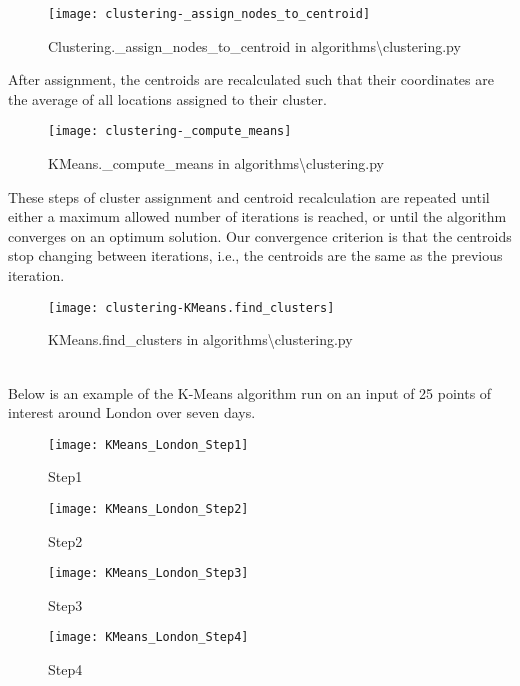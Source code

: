 \begin{figure}[H]\label{fig:_assign_nodes_to_centroid}
    \centering
    \texttt{[image: clustering-\_assign\_nodes\_to\_centroid]}
    \caption{Clustering.\_assign\_nodes\_to\_centroid in algorithms\textbackslash clustering.py}
\end{figure}
\noindent
After assignment, the centroids are recalculated such that their coordinates are the average of all locations
assigned to their cluster.

\begin{figure}[H]\label{fig:_compute_means}
    \centering
    \texttt{[image: clustering-\_compute\_means]}
    \caption{KMeans.\_compute\_means in algorithms\textbackslash clustering.py}
\end{figure}
\noindent
These steps of cluster assignment and centroid recalculation are repeated until either a maximum allowed number of
iterations is reached, or until the algorithm converges on an optimum solution.
Our convergence criterion is that the centroids stop changing between iterations, i.e., the centroids are the same
as the previous iteration.

\begin{figure}[H]\label{fig:find_clusters}
    \centering
    \texttt{[image: clustering-KMeans.find\_clusters]}
    \caption{KMeans.find\_clusters in algorithms\textbackslash clustering.py}
\end{figure}
\\
\noindent
Below is an example of the K-Means algorithm run on an input of 25 points of interest around London over seven days.

\begin{figure}[H]
    \ContinuedFloat*
    \texttt{[image: KMeans\_London\_Step1]}
    \caption{Step1}
\end{figure}
\begin{figure}[H]
    \ContinuedFloat
    \texttt{[image: KMeans\_London\_Step2]}
    \caption{Step2}
\end{figure}
\begin{figure}[H]
    \ContinuedFloat
    \texttt{[image: KMeans\_London\_Step3]}
    \caption{Step3}
\end{figure}
\begin{figure}[H]
    \ContinuedFloat
    \texttt{[image: KMeans\_London\_Step4]}
    \caption{Step4}
\end{figure}

